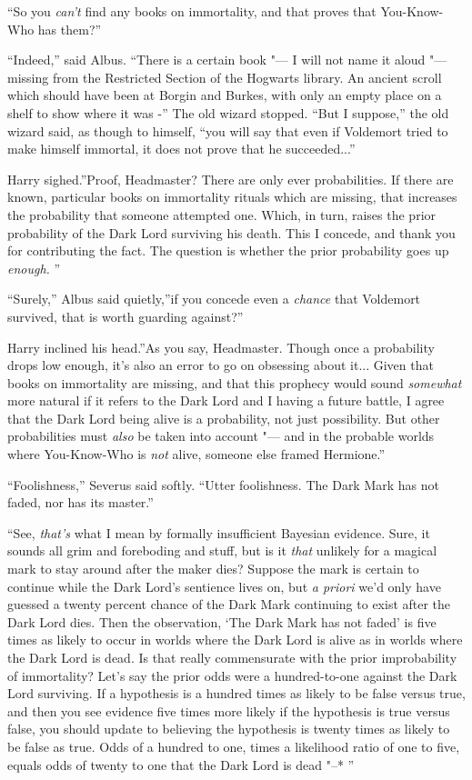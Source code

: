 ``So you \emph{can't} find any books on immortality, and that proves that
You-Know-Who has them?''

``Indeed,'' said Albus. ``There is a certain book "--- I will not name it
aloud "--- missing from the Restricted Section of the Hogwarts library. An
ancient scroll which should have been at Borgin and Burkes, with only an
empty place on a shelf to show where it was -'' The old wizard stopped.
``But I suppose,'' the old wizard said, as though to himself, ``you will
say that even if Voldemort tried to make himself immortal, it does not
prove that he succeeded...''

Harry sighed.''Proof, Headmaster? There are only ever probabilities. If
there are known, particular books on immortality rituals which are
missing, that increases the probability that someone attempted one.
Which, in turn, raises the prior probability of the Dark Lord surviving
his death. This I concede, and thank you for contributing the fact. The
question is whether the prior probability goes up \emph{enough.} ''

``Surely,'' Albus said quietly,''if you concede even a \emph{chance}
that Voldemort survived, that is worth guarding against?''

Harry inclined his head.''As you say, Headmaster. Though once a
probability drops low enough, it's also an error to go on obsessing
about it... Given that books on immortality are missing, and that
this prophecy would sound \emph{somewhat} more natural if it refers to
the Dark Lord and I having a future battle, I agree that the Dark Lord
being alive is a probability, not just possibility. But other
probabilities must \emph{also} be taken into account "--- and in the
probable worlds where You-Know-Who is \emph{not} alive, someone else
framed Hermione.''

``Foolishness,'' Severus said softly. ``Utter foolishness. The Dark Mark
has not faded, nor has its master.''

``See, \emph{that's} what I mean by formally insufficient Bayesian
evidence. Sure, it sounds all grim and foreboding and stuff, but is it
\emph{that} unlikely for a magical mark to stay around after the maker
dies? Suppose the mark is certain to continue while the Dark Lord's
sentience lives on, but \emph{a priori} we'd only have guessed a twenty
percent chance of the Dark Mark continuing to exist after the Dark Lord
dies. Then the observation, `The Dark Mark has not faded' is five times
as likely to occur in worlds where the Dark Lord is alive as in worlds
where the Dark Lord is dead. Is that really commensurate with the prior
improbability of immortality? Let's say the prior odds were a
hundred-to-one against the Dark Lord surviving. If a hypothesis is a
hundred times as likely to be false versus true, and then you see
evidence five times more likely if the hypothesis is true versus false,
you should update to believing the hypothesis is twenty times as likely
to be false as true. Odds of a hundred to one, times a likelihood ratio
of one to five, equals odds of twenty to one that the Dark Lord is dead
"--* ''

